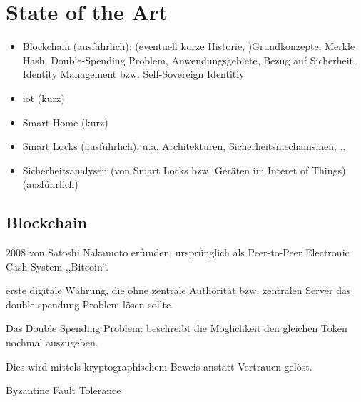 \section{State of the Art}
    \begin{itemize}
        \item Blockchain (ausführlich): (eventuell kurze Historie, )Grundkonzepte, Merkle Hash, Double-Spending Problem, Anwendungsgebiete, Bezug auf Sicherheit, Identity Management bzw. Self-Sovereign Identitiy
        \item \gls{iot} (kurz)
        \item Smart Home (kurz)
        \item Smart Locks (ausführlich): u.a. Architekturen, Sicherheitsmechanismen, ..
        \item Sicherheitsanalysen (von Smart Locks bzw. Geräten im Interet of Things) (ausführlich)
    \end{itemize}
    
    
\subsection{Blockchain}
    2008 von Satoshi Nakamoto erfunden, ursprünglich als Peer-to-Peer Electronic Cash System ,,Bitcoin``.
    
    erste digitale Währung, die 
    ohne zentrale Authorität bzw. zentralen Server das double-spendung Problem lösen sollte\cite{Nakamoto2008}. 
    
    Das Double Spending Problem: beschreibt die Möglichkeit den gleichen Token nochmal auszugeben\cite{Chohan2017}.
    
    Dies wird mittels kryptographischem Beweis anstatt Vertrauen gelöst\cite{Nakamoto2008}.
    
    
    Byzantine Fault Tolerance
 
 